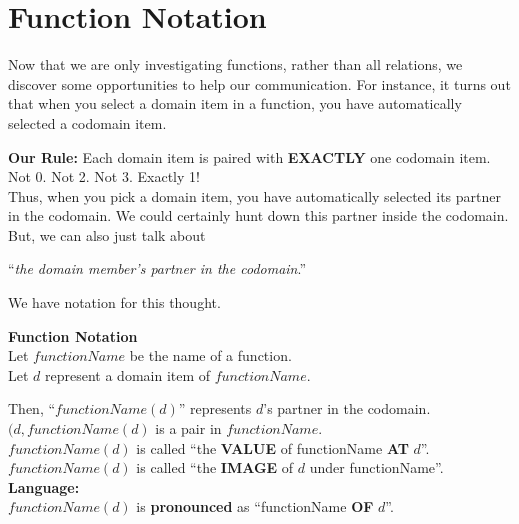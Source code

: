 \documentclass{ximera}
\begin{document}
\section{Function Notation}

Now that we are only investigating functions, rather than all relations, we discover some opportunities to help our communication.  For instance, it turns out that when you select a domain item in a function, you have automatically selected a codomain item.

\textbf{Our Rule:} Each domain item is paired with \textbf{\textcolor{purple!85!blue}{EXACTLY}} one codomain item.  Not 0. Not 2.  Not 3.  Exactly 1!  \\


Thus, when you pick a domain item, you have automatically selected its partner in the codomain.  We could certainly hunt down this partner inside the codomain.  But, we can also just talk about 


\begin{center}
``\textit{the domain member's partner in the codomain}.'' 
\end{center}



We have notation for this thought. \\

\begin{notation} \textbf{\textcolor{green!50!black}{Function Notation}}  \\

Let $functionName$ be the name of a function. \\
Let $d$ represent a domain item of $functionName$.

Then, ``$functionName(d)$'' represents $d$'s partner in the codomain. \\

$(d, functionName(d)$ is a pair in $functionName$. \\


$functionName(d)$ is called ``the \textbf{\textcolor{purple!85!blue}{VALUE}} of functionName \textbf{\textcolor{purple!85!blue}{AT}} $d$''. \\
$functionName(d)$ is called ``the \textbf{\textcolor{purple!85!blue}{IMAGE}} of $d$ under functionName''. \\


\textbf{\textcolor{red!80!black}{Language:}} \\
$functionName(d)$ is \textbf{\textcolor{blue!55!black}{pronounced}} as ``functionName \textbf{\textcolor{purple!85!blue}{OF}} $d$''.
\end{notation}
\end{document}
